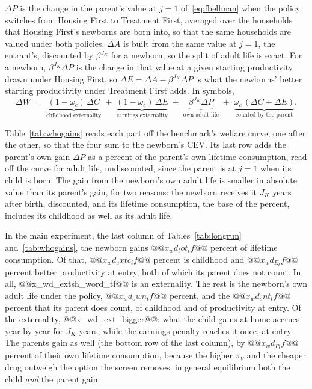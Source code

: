 \documentclass[10pt]{article}
\begin{document}
$\Delta P$ is the change in the parent's value at $j=1$ of~\eqref{eq:fbellman} when the policy switches from Housing First to Treatment First, averaged over the households that Housing First's newborns are born into, so that the same households are valued under both policies. $\Delta A$ is built from the same value at $j=1$, the entrant's, discounted by $\beta^{J_K}$ for a newborn, so the split of adult life is exact. For a newborn, $\beta^{J_K}\Delta P$ is the change in that value at a given starting productivity drawn under Housing First, so $\Delta E$$=\Delta A-\beta^{J_K}\Delta P$ is what the newborns' better starting productivity under Treatment First adds. In symbols,
\begin{equation}\label{eq:parts}
\Delta W\;=\;\underbrace{(1-\omega_c)\,\Delta C}_{\text{childhood externality}}\;+\;\underbrace{(1-\omega_c)\,\Delta E}_{\text{earnings externality}}\;+\;\underbrace{\beta^{J_K}\Delta P}_{\text{own adult life}}\;+\;\underbrace{\omega_c\,(\Delta C+\Delta E)}_{\text{counted by the parent}}.
\end{equation}

Table~\ref{tab:whogains} reads each part off the benchmark's welfare curve, one after the other, so that the four sum to the newborn's CEV. Its last row adds the parent's own gain $\Delta P$ as a percent of the parent's own lifetime consumption, read off the curve for adult life, undiscounted, since the parent is at $j=1$ when its child is born. The gain from the newborn's own adult life is smaller in absolute value than its parent's gain, for two reasons: the newborn receives it $J_K$ years after birth, discounted, and its lifetime consumption, the base of the percent, includes its childhood as well as its adult life.



In the main experiment, the last column of Tables~\ref{tab:longrun} and~\ref{tab:whogains}, the newborn gains $@@x_wd_tot_tf@@$ percent of lifetime consumption. Of that, $@@x_wd_extc_tf@@$ percent is childhood and $@@x_wd_E_tf@@$ percent better productivity at entry, both of which its parent does not count. In all, @@x_wd_extsh_word_tf@@ is an externality. The rest is the newborn's own adult life under the policy, $@@x_wd_own_tf@@$ percent, and the $@@x_wd_cnt_tf@@$ percent that its parent does count, of childhood and of productivity at entry. Of the externality, @@x_wd_ext_bigger@@: what the child gains at home accrues year by year for $J_K$ years, while the earnings penalty reaches it once, at entry. The parents gain as well (the bottom row of the last column), by $@@x_wd_P_tf@@$ percent of their own lifetime consumption, because the higher $\pi_V$ and the cheaper drug outweigh the option the screen removes: in general equilibrium both the child \emph{and} the parent gain.
\end{document}
